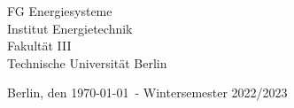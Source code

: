 \begin{center}
\enlargethispage{1cm}

\vfill %

FG Energiesysteme \vspace{2.5mm} \\
Institut Energietechnik \vspace{2.5mm} \\
Fakultät III \vspace{2.5mm} \\
Technische Universität Berlin \vspace{2.5mm} \\

\vspace{1cm}

Berlin, den \today~- Wintersemester 2022/2023
    
\end{center}
